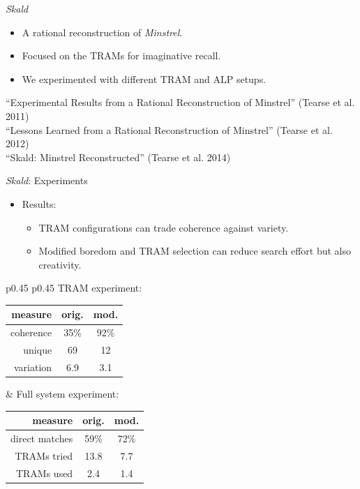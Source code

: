 \documentclass[xcolor=x11names]{beamer}
\def\minstrel/{\textit{Minstrel}}
\def\skald/{\textit{Skald}}
\begin{document}
\begin{frame}{\skald/}
  \vfill
  \begin{itemize}\addtolength{\itemsep}{0.5\baselineskip}
    \item A rational reconstruction of \minstrel/.
    \item Focused on the TRAMs for imaginative recall.
    \item We experimented with different TRAM and ALP setups.
  \end{itemize}
  \vfill
  \centering
  \tiny ``Experimental Results from a Rational Reconstruction of Minstrel'' (Tearse et al. 2011) \\
  \tiny ``Lessons Learned from a Rational Reconstruction of Minstrel'' (Tearse et al. 2012) \\
  \tiny ``Skald: Minstrel Reconstructed'' (Tearse et al. 2014) \\
\end{frame}

\begin{frame}{\skald/: Experiments}
  \begin{itemize}\addtolength{\itemsep}{0.5\baselineskip}
    \item Results:
    \begin{itemize}\addtolength{\itemsep}{0.5\baselineskip}
      \vspace{0.5\baselineskip}
      \item TRAM configurations can trade coherence against variety.
      \item Modified boredom and TRAM selection can reduce search effort but also creativity.
    \end{itemize}
  \end{itemize}
  \vspace{1ex}
  \begin{tabular}{p{} p{}}
  \scriptsize
  \centering
  TRAM experiment: \newline
  \begin{tabular}{r c c}
      \toprule
      measure & orig. & mod. \\
      \midrule
      coherence & 35\% & 92\%  \\
      unique & 69 & 12 \\
      variation & 6.9 & 3.1  \\
      \bottomrule
  \end{tabular}
  &
  \scriptsize
  \centering
  Full system experiment: \newline
  \begin{tabular}{r c c}
      \toprule
      measure & orig. & mod. \\
      \midrule
      direct matches & 59\% & 72\% \\
      TRAMs tried & 13.8 & 7.7  \\
      TRAMs used & 2.4 & 1.4  \\
      \bottomrule
  \end{tabular} \newline
\end{tabular}
\end{frame}
\end{document}
